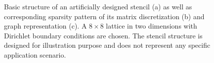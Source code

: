 \begin{figure}[tbhp]
	\centering
	\hspace{0.8em}
	\hspace{1em}
	\caption{Basic structure of an artificially designed stencil (a) as well as corresponding sparsity pattern of its matrix discretization (b) and graph representation (c). A $8 \times 8$ lattice in two dimensions with Dirichlet boundary conditions are chosen. The stencil structure is designed for illustration purpose and does not represent any specific application scenario.}
	\label{fig:2d-7pt}
\end{figure}

